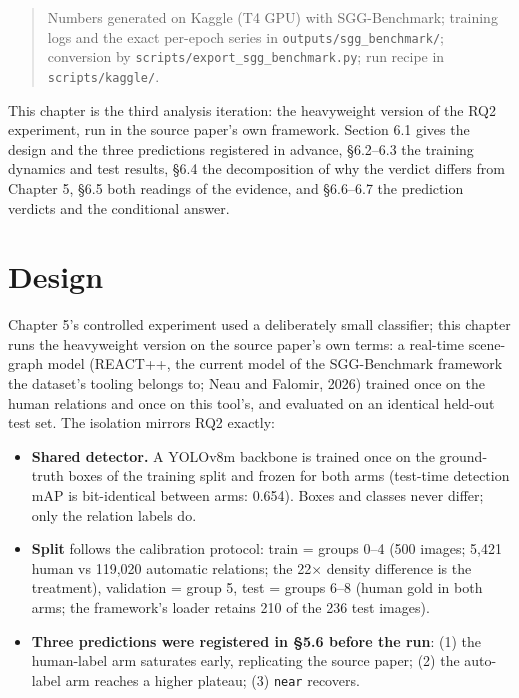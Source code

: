 
\begin{quote}
Numbers generated on Kaggle (T4 GPU) with SGG-Benchmark; training logs and the exact per-epoch series in \texttt{outputs/sgg\_benchmark/}; conversion by \texttt{scripts/export\_sgg\_benchmark.py}; run recipe in \texttt{scripts/kaggle/}.
\end{quote}

This chapter is the third analysis iteration: the heavyweight version of the RQ2 experiment, run in the source paper's own framework. Section 6.1 gives the design and the three predictions registered in advance, \S6.2--6.3 the training dynamics and test results, \S6.4 the decomposition of why the verdict differs from Chapter 5, \S6.5 both readings of the evidence, and \S6.6--6.7 the prediction verdicts and the conditional answer.

\section{Design}

Chapter 5's controlled experiment used a deliberately small classifier; this chapter runs the heavyweight version on the source paper's own terms: a real-time scene-graph model (REACT++, the current model of the SGG-Benchmark framework the dataset's tooling belongs to; Neau and Falomir, 2026) trained once on the human relations and once on this tool's, and evaluated on an identical held-out test set. The isolation mirrors RQ2 exactly:

\begin{itemize}
\item \textbf{Shared detector.} A YOLOv8m backbone is trained once on the ground-truth
boxes of the training split and frozen for both arms (test-time detection mAP is bit-identical between arms: 0.654). Boxes and classes never differ; only the relation labels do.
\item \textbf{Split} follows the calibration protocol: train = groups 0--4 (500 images;
5,421 human vs 119,020 automatic relations; the 22$\times$ density difference is the treatment), validation = group 5, test = groups 6--8 (human gold in both arms; the framework's loader retains 210 of the 236 test images).
\item \textbf{Three predictions were registered in \S5.6 before the run}: (1) the
human-label arm saturates early, replicating the source paper; (2) the auto-label arm reaches a higher plateau; (3) \texttt{near} recovers.
\end{itemize}

